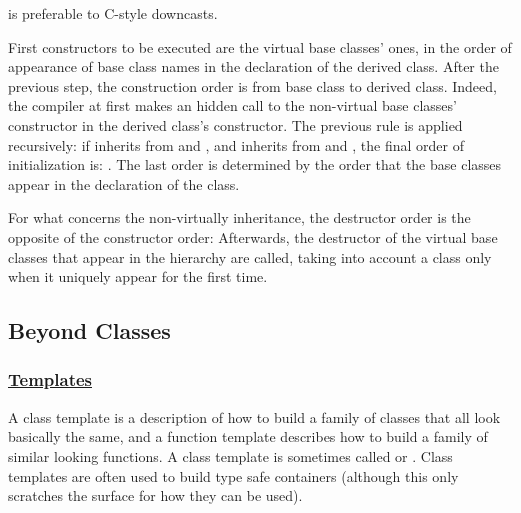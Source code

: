  is preferable to C-style downcasts.
 
First constructors to be executed are the virtual base classes' ones, 
in the order of appearance of base class names in the declaration of 
the derived class.
\newline
After the previous step, the construction order is from base class to 
derived class. Indeed, the compiler at first makes an hidden call to 
the non-virtual base classes' constructor in the derived class's 
constructor.
\newline
The previous rule is applied recursively: if  inherits 
from  and , and 
inherits from  and , the final order 
of initialization is: \newline
{}.
\newline
The last order is determined by the order that the base classes appear 
in the declaration of the class.

For what concerns the non-virtually inheritance, the destructor order 
is the opposite of the constructor order:
\newline
{}
\newline
Afterwards, the destructor of the virtual base classes that appear in 
the hierarchy are called, taking into account a class only when it uniquely 
appear for the first time.
\newpage


\subsection{Beyond Classes}
\subsubsection{\href{https://isocpp.org/wiki/faq/templates}{Templates}}

A class template is a description of how to build a family of classes 
that all look basically the same, and a function template describes how 
to build a family of similar looking functions.
\newline
A class template is sometimes called  or 
.
\newline
Class templates are often used to build type safe containers 
(although this only scratches the surface for how they can be used).

